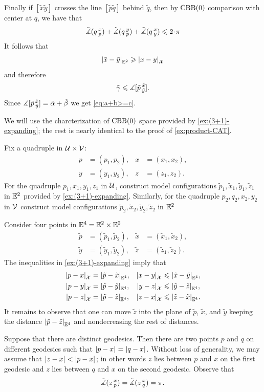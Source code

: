 Finally if $[\tilde x \tilde y]$ crosses the line $[\tilde p\tilde q]$ behind $\tilde q$,
then by $\mathrm{CBB}(0)$ comparison with center at $q$, we have that 
\[\angk qxp+\angk qyp+\angk qxy\le 2\cdot\pi\]
It follows that 
\[\dist{\tilde x}{\tilde y}{\EE^2}\ge\dist{ x}{ y}{\spc{X}}\]
and therefore 
\[\tilde \gamma\leqslant \measuredangle[\tilde p\,{}^{\tilde x}_{\tilde y}].\]
Since $\measuredangle[\tilde p\,{}^{\tilde x}_{\tilde y}]=\tilde\alpha+\tilde\beta$ we get \ref{eq:a+b>=c}.

We will use the charcterization of $\mathrm{CBB}(0)$ space provided by \ref{ex:(3+1)-expanding}; the rest is nearly identical to the proof of \ref{ex:product-CAT}.

Fix a quadruple in $\mathcal{U}\times \mathcal{V}$:
\begin{align*}
p&=(p_1,p_2),
&
x&=(x_1,x_2),
\\
y&=(y_1,y_2),
&
z&=(z_1,z_2).
\end{align*}
For the quadruple $p_1,x_1,y_1,z_1$ in $\mathcal{U}$,
construct model configurations  $\tilde p_1,\tilde x_1,\tilde y_1,\tilde z_1$ in $\mathbb{E}^2$ provided by \ref{ex:(3+1)-expanding}.  
Similarly, for the quadruple $p_2,q_2,x_2,y_2$ in $\mathcal{V}$
construct model configurations  $\tilde p_2,\tilde x_2,\tilde y_2,\tilde z_2$ in $\mathbb{E}^2$

Consider four points in $\mathbb{E}^4=\mathbb{E}^2\times\mathbb{E}^2$ 
\begin{align*}
\tilde p&=(\tilde p_1,\tilde p_2),
&
\tilde x&=(\tilde x_1,\tilde x_2),
\\
\tilde y&=(\tilde y_1,\tilde y_2),
&
\tilde z&=(\tilde z_1,\tilde z_2).
\end{align*}
The inequalities in  \ref{ex:(3+1)-expanding} imply that
\begin{align*}
\dist{p}{x}{\spc{X}}&=\dist{\tilde p}{\tilde x}{\EE^4},
&
\dist{x}{y}{\spc{X}}&\le\dist{\tilde x}{\tilde y}{\EE^4},
\\
\dist{p}{y}{\spc{X}}&=\dist{\tilde p}{\tilde y}{\EE^4},
&
\dist{y}{z}{\spc{X}}&\le\dist{\tilde y}{\tilde z}{\EE^4},
\\
\dist{p}{z}{\spc{X}}&=\dist{\tilde p}{\tilde z}{\EE^4},
&
\dist{z}{x}{\spc{X}}&\le\dist{\tilde z}{\tilde x}{\EE^4}.
\end{align*}
It remains to observe that one can move $\tilde z$ into the plane of $\tilde p$, $\tilde x$, and $\tilde y$ keeping the distance $\dist{\tilde p}{\tilde z}{\EE^4}$ and nondecreasing the rest of distances. 

Suppose that there are distinct geodesics.
Then there are two points $p$ and $q$ on different geodesics such that $\dist{p}{x}{}=\dist{q}{x}{}$.
Without loss of generality, we may assume that $\dist{z}{x}{}<\dist{p}{x}{}$;
in other words $z$ lies between $p$ and $x$ on the first geodesic and 
$z$ lies between $q$ and $x$ on the second geodesic.
Observe that 
\[\tilde\measuredangle(z\,{}^{x}_{p})=\tilde\measuredangle(z\,{}^{x}_{q})=\pi.\]

